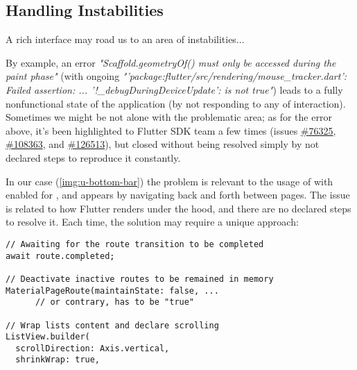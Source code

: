 
\subsection{Handling Instabilities}

A rich interface may road us to an area of instabilities...

By example, an error \emph{"Scaffold.geometryOf() must only be accessed during the paint phase"} (with ongoing 
\emph{"'package:flutter/src/rendering/mouse\_tracker.dart': Failed assertion: ... '!\_debugDuringDeviceUpdate': 
is not true"}) leads to a fully nonfunctional state  of the application (by not responding to any of interaction).
Sometimes we might be not alone with the problematic area; as for the error above, it's been highlighted to Flutter 
SDK team a few times (issues \href{https://github.com/flutter/flutter/issues/76325}{\#76325},
\href{https://github.com/flutter/flutter/issues/108363}{\#108363}, and
\href{https://github.com/flutter/flutter/issues/126513}{\#126513}), but closed without being resolved simply by not 
declared steps to reproduce it constantly.


In our case (\cref{img:u-bottom-bar}) the problem is relevant to the usage of  
with enabled  for , and appears by navigating back and forth between pages. The issue 
is related to how Flutter renders under the hood, and there are no declared steps to resolve it. Each time, the 
solution may require a unique approach:

\begin{lstlisting}
// Awaiting for the route transition to be completed
await route.completed;

// Deactivate inactive routes to be remained in memory
MaterialPageRoute(maintainState: false, ... 
      // or contrary, has to be "true"

// Wrap lists content and declare scrolling
ListView.builder(
  scrollDirection: Axis.vertical,
  shrinkWrap: true,
\end{lstlisting}

